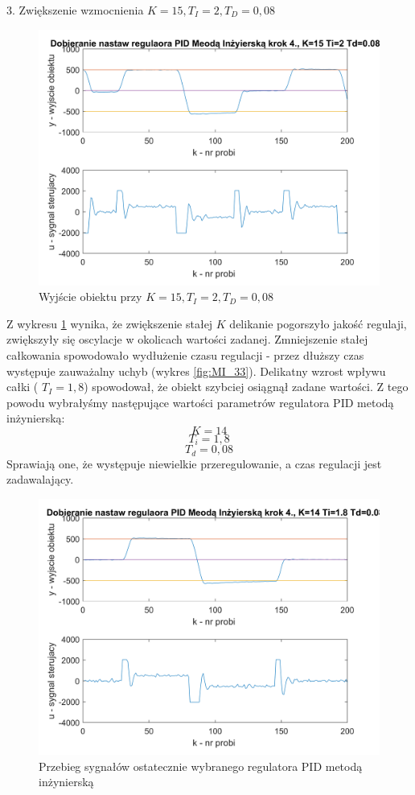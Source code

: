 \documentclass[a4paper, 10pt]{article}
\begin{document}
3. Zwiększenie wzmocnienia $K=15,  T_{I}=2,  T_{D}=0,08$ 
\begin{figure}[H]
	\centering
	\includegraphics[width=0.9\linewidth]{MI_22}
	\caption{Wyjście obiektu przy $K=15, T_{I}=2, T_{D}=0,08 $  }
	\label{fig:MI_22}
\end{figure}
Z wykresu \ref{fig:MI_22} wynika, że zwiększenie stałej $K$ delikanie pogorszyło jakość regulaji, zwiększyły się oscylacje w okolicach wartości zadanej. Zmniejszenie stałej całkowania spowodowało wydłużenie czasu regulacji - przez dłuższy czas występuje zauważalny uchyb (wykres \ref{fig:MI_33}). Delikatny wzrost wpływu całki ( $T_{I}=1,8$) spowodował, że obiekt szybciej osiągnął zadane wartości. Z tego powodu wybrałyśmy następujące wartości parametrów regulatora PID metodą inżynierską:
\[K = 14\]
\[T_{i} = 1,8\]
\[T_{d} = 0,08\]
Sprawiają one, że występuje niewielkie przeregulowanie, a czas regulacji jest zadawalający. 
\begin{figure}[H]
	\centering
	\includegraphics[width=0.9\linewidth]{MI_11}
	\caption{Przebieg sygnałów ostatecznie wybranego regulatora PID metodą inżynierską}
	\label{fig:MI_ost}
\end{figure}
\end{document}
